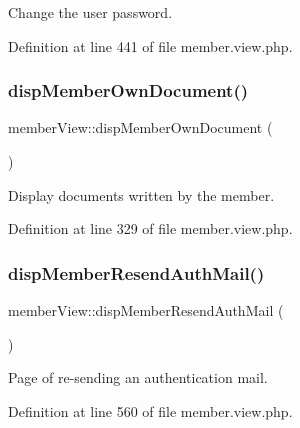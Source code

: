 Change the user password. 



Definition at line 441 of file member.\+view.\+php.

\mbox{\label{classmemberView_a8c235800dc5fc7484694b852cf7119c6}} 
\subsubsection{\texorpdfstring{disp\+Member\+Own\+Document()}{dispMemberOwnDocument()}}
{\footnotesize\ttfamily member\+View\+::disp\+Member\+Own\+Document (\begin{DoxyParamCaption}{ }\end{DoxyParamCaption})}



Display documents written by the member. 



Definition at line 329 of file member.\+view.\+php.

\mbox{\label{classmemberView_a6796539153aa0a8deda927e51ba302ed}} 
\subsubsection{\texorpdfstring{disp\+Member\+Resend\+Auth\+Mail()}{dispMemberResendAuthMail()}}
{\footnotesize\ttfamily member\+View\+::disp\+Member\+Resend\+Auth\+Mail (\begin{DoxyParamCaption}{ }\end{DoxyParamCaption})}



Page of re-\/sending an authentication mail. 



Definition at line 560 of file member.\+view.\+php.

\mbox{\label{classmemberView_a2438b4d67ac1620d9cc5c74e81f09c68}} 
